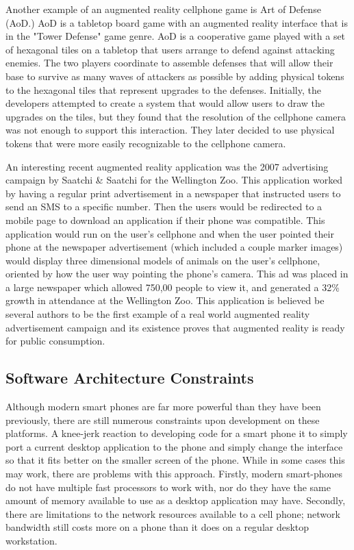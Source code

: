 \documentclass{acm_proc_article-sp}
\begin{document}
Another example of an augmented reality cellphone game is Art of Defense (AoD.) AoD is a tabletop board game with an augmented reality interface that is in the "Tower Defense" game genre.  AoD is a cooperative game played with a set of hexagonal tiles on a tabletop that users arrange to defend against attacking enemies.  The two players coordinate to assemble defenses that will allow their base to survive as many waves of attackers as possible by adding physical tokens to the hexagonal tiles that represent upgrades to the defenses.  Initially, the developers attempted to create a system that would allow users to draw the upgrades on the tiles, but they found that the resolution of the cellphone camera was not enough to support this interaction. They later decided to use physical tokens that were more easily recognizable to the cellphone camera.  \cite{huynh2009art}

An interesting recent augmented reality application was the 2007 advertising campaign by Saatchi \& Saatchi
for the Wellington Zoo.  This application worked by having a regular print advertisement in a newspaper that instructed users to send an SMS to a specific number.  Then the users would be redirected to a mobile page to download an application if their phone was compatible.  This application would run on the user's cellphone and when the user pointed their phone at the newspaper advertisement (which included a couple marker images) would display three dimensional models of animals on the user's cellphone, oriented by how the user way pointing the phone's camera.  \cite{henrysson2007bringing} This ad was placed in a large newspaper which allowed 750,00 people to view it, and generated a 32\% growth in attendance at the Wellington Zoo. \cite{ar.wellington.zoo}  This application is believed be several authors to be the first example of a real world augmented reality advertisement campaign and its existence proves that augmented reality is ready for public consumption. \cite{henrysson2007bringing} \cite{wang2010authoring}

\subsection{Software Architecture Constraints}
Although modern smart phones are far more powerful than they have been previously, there are still numerous constraints upon development on these platforms.  A knee-jerk reaction to developing code for a smart phone it to simply port a current desktop application to the phone and simply change the interface so that it fits better on the smaller screen of the phone.  While in some cases this may work, there are problems with this approach.  Firstly, modern smart-phones do not have multiple fast processors to work with, nor do they have the same amount of memory available to use as a desktop application may have.  Secondly, there are limitations to the network resources available to a cell phone; network bandwidth still costs more on a phone than it does on a regular desktop workstation.  \cite{wagner2009making}  
\end{document}
